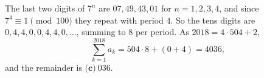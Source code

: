 The last two digits of $7^n$ are $07,49,43,01$ for $n=1,2,3,4$, and since $7^4\equiv1\pmod{100}$ they repeat with period $4$. So the tens digits are $0,4,4,0,0,4,4,0,\dots$, summing to $8$ per period. As $2018=4\cdot504+2$,
\[
\sum_{k=1}^{2018}a_k=504\cdot8+(0+4)=4036,
\]
and the remainder is $\boxed{\textbf{(c)}\ 036}$.
